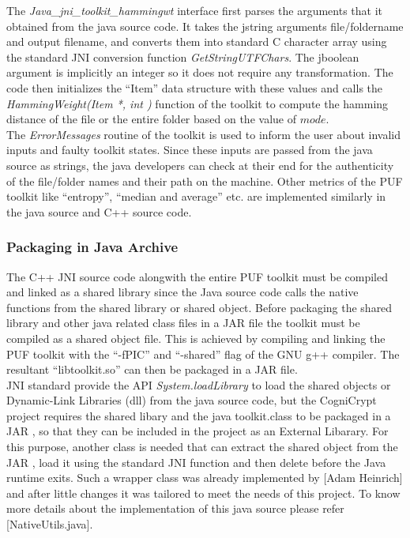 The \emph{Java\_jni\_toolkit\_hammingwt} interface first parses the arguments that it obtained from the java source code. It takes the jstring arguments file/foldername and output filename, and converts them into standard C character array using the standard JNI conversion function \emph{GetStringUTFChars}. The jboolean argument is implicitly an integer so it does not require any transformation. The code then initializes the ``Item'' data structure with these values and calls the \emph{HammingWeight(Item *, int )} function of the toolkit to compute the hamming distance of the file or the entire folder based on the value of $mode$.\\ 

The \emph{ErrorMessages} routine of the toolkit is used to inform the user about invalid inputs and faulty toolkit states. Since these inputs are passed from the java source as strings, the java developers can check at their end for the authenticity of the file/folder names and their path on the machine. Other metrics of the PUF toolkit like ``entropy'', ``median and average'' etc. are implemented similarly in the java source and C++ source code.\\

\subsubsection{Packaging in Java Archive}
The C++ JNI source code alongwith the entire PUF toolkit must be compiled and linked as a shared library since the Java source code calls the native functions from the shared library or shared object. Before packaging the shared library and other java related class files in a JAR file the toolkit must be compiled as a shared object file. This is achieved by compiling and linking the PUF toolkit with the
``-fPIC'' and ``-shared'' flag of the GNU g++ compiler. The resultant ``libtoolkit.so'' can then be packaged in a JAR file.\\

JNI standard provide the API \emph{System.loadLibrary} to load the shared objects or Dynamic-Link Libraries (dll) from the java source code, but the CogniCrypt project requires the shared libary and the java toolkit.class to be packaged in a JAR , so that they can be included in the project as an External Libarary. For this purpose, another class is needed that can extract the shared object from the JAR , load it using the standard JNI function and then delete before the Java runtime exits. Such
a wrapper class was already implemented by [Adam Heinrich] and after little changes it was tailored to meet the needs of this project. To know more details about the implementation of this java source please refer [NativeUtils.java].\\

